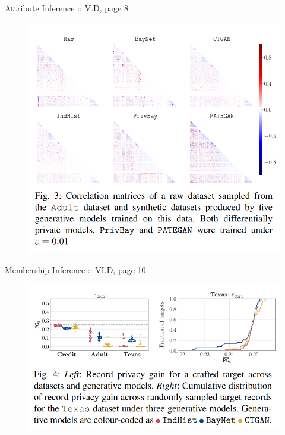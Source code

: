 \documentclass[xcolor=dvipsnames,compress]{beamer}
\begin{document}
\begin{frame}{Attribute Inference :: V.D, page {\small 8}}
	\vspace{1cm}
	\begin{figure}
	\centering
	\includegraphics[scale=0.3]{images/fig3.png}
	\end{figure}
\end{frame}

\begin{frame}{Membership Inference :: VI.D, page {\small 10}}
    \begin{figure}
	\centering
	\includegraphics[scale=0.35]{images/fig4.png}
	\end{figure}
\end{frame}
\end{document}

